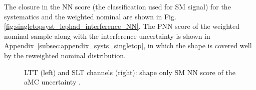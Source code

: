 The closure in the NN score (the classification used for SM signal) for the 
systematics and the weighted nominal are shown in 
Fig.\ref{fig:singletopsyst_lephad_interference_NN}. 
The PNN score of the weighted nominal sample along with the interference uncertainty is shown in Appendix~\ref{subsec:appendix_systs_singletop}, 
in which the shape is covered well by the reweighted nominal distribution. 


\begin{figure}
  \centering
  \caption{LTT (left) and SLT channels (right): shape only SM NN score of the aMC uncertainty .}
  \label{fig:singletopsyst_lephad_aMC_NN}
  \end{figure}


